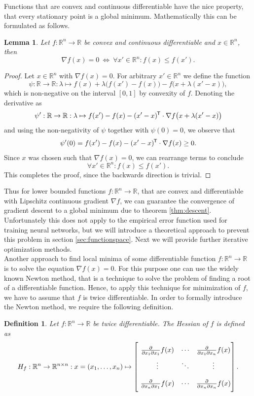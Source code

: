 \documentclass[11pt, a4paper]{article}
\newtheorem{lemma}[theorem]{Lemma}
\newtheorem{definition}[theorem]{Definition}
\newcommand{\R}{\mathbb{R}}
\newcommand*{\tr}{^{\mkern-1.5mu\mathsf{T}}}
\begin{document}
Functions that are convex and continuous differentiable have the nice property, that every stationary point is a global minimum. Mathematically this can be formulated as follows.

\begin{lemma}
Let $f: \R^n \to \R$ be convex and continuous differentiable and $x \in \R^n$, then
\[ \nabla f(x) = 0 \ \Leftrightarrow \ \forall x' \in \R^n : f(x) \leq f(x').  \]
\end{lemma}

\begin{proof}
Let $x \in \R^n$ with $\nabla f(x) = 0$. For arbitrary $x' \in \R^n$ we define the function
\[ \psi : \R \to \R : \lambda \mapsto f(x) + \lambda \big ( f(x') - f(x) \big ) - f \big ( x + \lambda (x'-x) \big ), \]
which is non-negative on the interval $[0,1]$ by convexity of $f$. Denoting the derivative as
\[ \psi' : \R \to \R : \lambda \mapsto f(x') - f(x) - (x'-x) \tr \cdot \nabla f \big (x + \lambda(x'-x)\big ) \]
and using the non-negativity of $\psi$ together with $\psi(0) = 0$, we observe that
\[ \psi'(0) = f(x') - f(x) - (x'-x) \tr \cdot \nabla f(x) \geq 0. \]
Since $x$ was chosen such that $\nabla f(x) = 0$, we can rearrange terms to conclude
\[ \forall x' \in \R^n : f(x) \leq f(x'). \]
This completes the proof, since the backwards direction is trivial.
\end{proof}

Thus for lower bounded functions $f: \R^n \to \R$, that are convex and differentiable with Lipschitz continuous gradient $\nabla f$, we can guarantee the convergence of gradient descent to a global minimum due to theorem \ref{thm:descent}. Unfortunately this does not apply to the empirical error function used for training neural networks, but we will introduce a theoretical approach to prevent this problem in section \ref{sec:functionspace}. Next we will provide further iterative optimization methods. \\

Another approach to find local minima of some differentiable function $f: \R^n \to \R$ is to solve the equation $\nabla f(x) = 0$. For this purpose one can use the widely known Newton method, that is a technique to solve the problem of finding a root of a differentiable function. Hence, to apply this technique for minimization of $f$, we have to assume that $f$ is twice differentiable. In order to formally introduce the Newton method, we require the following definition.

\begin{definition}
Let $f: \R^n \to \R$ be twice differentiable. The Hessian of $f$ is defined as
\[ H_f : \R^n \to \R^{n \times n} : x = (x_1, \dots, x_n) \mapsto \begin{bmatrix} \textcolor{white}{\bigg |} \frac{\partial}{\partial x_1 \partial x_1} f(x) & \cdots & \frac{\partial}{\partial x_1 \partial x_n} f(x) \\ \textcolor{white}{\bigg |} \vdots & \ddots & \vdots \\ \textcolor{white}{\bigg |} \frac{\partial}{\partial x_n \partial x_1} f(x) & \cdots & \frac{\partial}{\partial x_n \partial x_n} f(x) \end{bmatrix}. \]
\end{definition}
\end{document}

